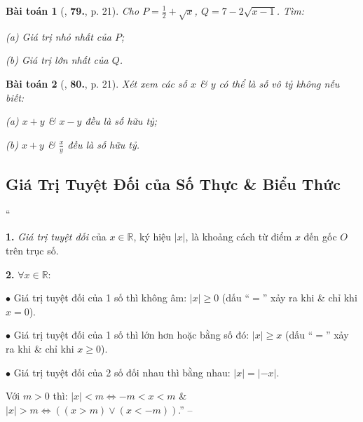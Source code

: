 \documentclass{article}
\numberwithin{equation}{section}
\newtheorem{baitoan}{Bài toán}
\begin{document}
\begin{baitoan}[\cite{Tuyen_Toan_7}, \textbf{79.}, p. 21]
	Cho $P = \frac{1}{2} + \sqrt{x}$, $Q = 7 - 2\sqrt{x - 1}$. Tìm:
	\begin{enumerate*}
		\item[(a)] Giá trị nhỏ nhất của $P$;
		\item[(b)] Giá trị lớn nhất của $Q$.
	\end{enumerate*}
\end{baitoan}

\begin{baitoan}[\cite{Tuyen_Toan_7}, \textbf{80.}, p. 21]
	Xét xem các số $x$ \& $y$ có thể là số vô tỷ không nếu biết:
	\begin{enumerate*}
		\item[(a)] $x + y$ \& $x - y$ đều là số hữu tỷ;
		\item[(b)] $x + y$ \& $\frac{x}{y}$ đều là số hữu tỷ.
	\end{enumerate*}
\end{baitoan}


\subsection{Giá Trị Tuyệt Đối của  Số Thực \& Biểu Thức}
``\begin{enumerate*}
	\item[\textbf{1.}] \textit{Giá trị tuyệt đối} của $x\in\mathbb{R}$, ký hiệu $|x|$, là khoảng cách từ điểm $x$ đến gốc $O$ trên trục số.
	\item[\textbf{2.}] $\forall x\in\mathbb{R}$:
	\begin{enumerate*}
		\item[$\bullet$] Giá trị tuyệt đối của 1 số thì không âm: $|x|\ge 0$ (dấu ``$=$'' xảy ra khi \& chỉ khi $x = 0$).
		\item[$\bullet$] Giá trị tuyệt đối của 1 số thì lớn hơn hoặc bằng số đó: $|x|\ge x$ (dấu ``$=$'' xảy ra khi \& chỉ khi $x\ge 0$).
		\item[$\bullet$] Giá trị tuyệt đối của 2 số đối nhau thì bằng nhau: $|x| = |-x|$.
	\end{enumerate*}
\end{enumerate*}
Với $m > 0$ thì: $|x| < m\Leftrightarrow -m < x < m$ \& $|x| > m\Leftrightarrow((x > m)\lor(x < - m))$.'' -- \cite[Chap. 2, \S3, pp. 21--22]{Tuyen_Toan_7}
\end{document}
